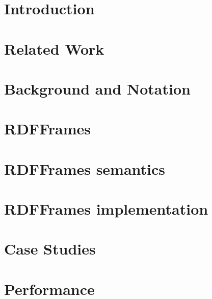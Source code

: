 \documentclass[sigconf, review, anonymous]{acmart}
\begin{document}
\maketitle

\section{Introduction}



\section{Related Work}



\section{Background and Notation}


\section{RDFFrames}


\section{RDFFrames semantics}


\section{RDFFrames implementation}


\section{Case Studies}



\section{Performance}



\begin{acks}

\end{acks}





\end{document}
